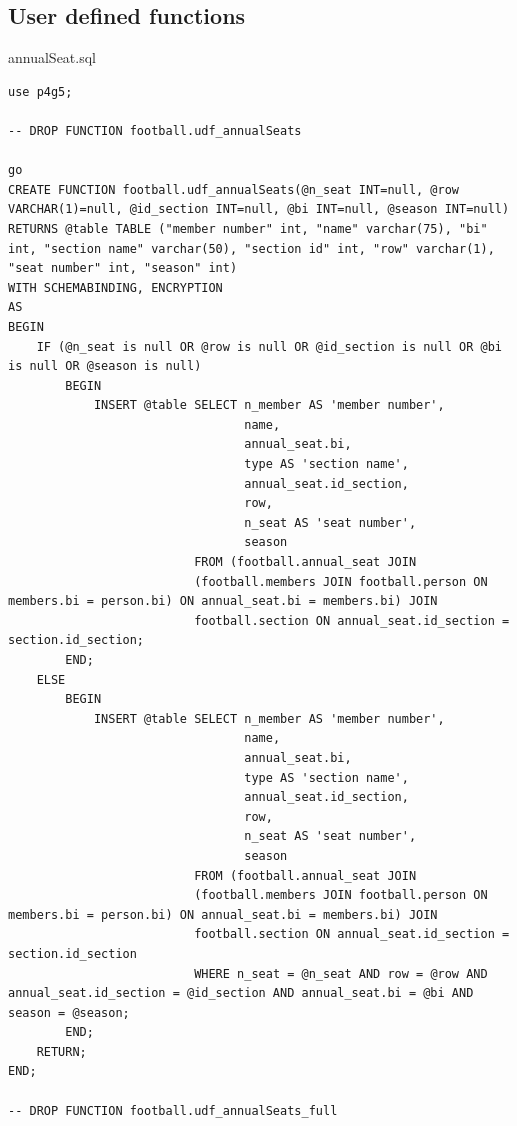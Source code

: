 \documentclass[pdftex,12pt,a4paper]{report}
\begin{document}
\newpage
\subsection*{User defined functions}
annualSeat.sql
\begin{lstlisting} 
use p4g5;

-- DROP FUNCTION football.udf_annualSeats

go
CREATE FUNCTION football.udf_annualSeats(@n_seat INT=null, @row VARCHAR(1)=null, @id_section INT=null, @bi INT=null, @season INT=null)
RETURNS @table TABLE ("member number" int, "name" varchar(75), "bi" int, "section name" varchar(50), "section id" int, "row" varchar(1), "seat number" int, "season" int)
WITH SCHEMABINDING, ENCRYPTION
AS
BEGIN
	IF (@n_seat is null OR @row is null OR @id_section is null OR @bi is null OR @season is null)
		BEGIN
			INSERT @table SELECT n_member AS 'member number',
								 name,
								 annual_seat.bi,
								 type AS 'section name',
								 annual_seat.id_section,
								 row, 
								 n_seat AS 'seat number', 
								 season
						  FROM (football.annual_seat JOIN 
						  (football.members JOIN football.person ON members.bi = person.bi) ON annual_seat.bi = members.bi) JOIN
						  football.section ON annual_seat.id_section = section.id_section;
		END;
	ELSE
		BEGIN
			INSERT @table SELECT n_member AS 'member number',
								 name, 
								 annual_seat.bi, 
								 type AS 'section name', 
								 annual_seat.id_section,
								 row, 
								 n_seat AS 'seat number', 
								 season
						  FROM (football.annual_seat JOIN 
						  (football.members JOIN football.person ON members.bi = person.bi) ON annual_seat.bi = members.bi) JOIN
						  football.section ON annual_seat.id_section = section.id_section
						  WHERE n_seat = @n_seat AND row = @row AND annual_seat.id_section = @id_section AND annual_seat.bi = @bi AND season = @season;
		END;
	RETURN;
END;

-- DROP FUNCTION football.udf_annualSeats_full


\end{lstlisting}
\end{document}
